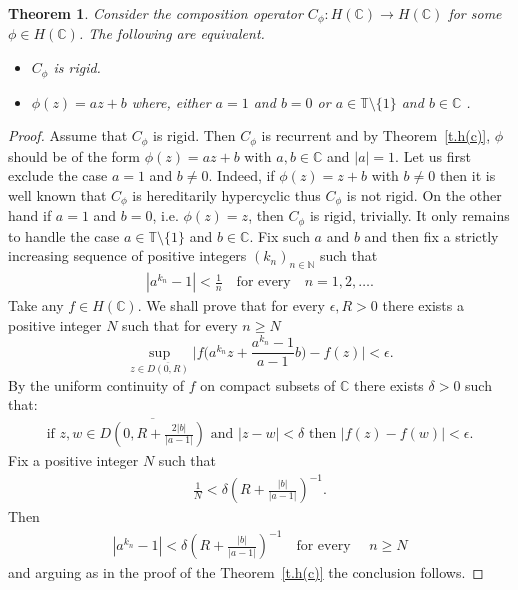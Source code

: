 \documentclass[12pt,leqno]{amsart}
\theoremstyle{plain}
\newtheorem{theorem}[equation]{Theorem}
\theoremstyle{definition}
\numberwithin{equation}{section}
\begin{document}
\begin{theorem}
	\label{t.h(rigid)} Consider the composition operator $C_\phi:H(\mathbb C)\to H(\mathbb C)$ for some $\phi \in H(\mathbb C)$. The following are equivalent. 
	\begin{itemize}
		\item[(i)] $C_{\phi}$ is rigid. 
		\item[(ii)] $\phi(z)=az+b$ where, either $a=1$ and $b=0$ or $a\in \mathbb T\setminus \{ 1\}$ and $b\in \mathbb C$ . 
	\end{itemize}
\end{theorem}

\begin{proof}
	Assume that $C_\phi$ is rigid. Then $C_\phi$ is recurrent and by Theorem~\ref{t.h(c)}, $\phi$ should be of the form $\phi(z)=az+b$ with $a,b\in\mathbb C$ and $|a|=1$. Let us first exclude the case $a=1$ and $b\neq 0$. Indeed, if $\phi (z)=z+b$ with $b\neq 0$ then it is well known that $C_{\phi}$ is hereditarily hypercyclic thus $C_{\phi}$ is not rigid. On the other hand if $a=1$ and $b=0$, i.e. $\phi (z)=z$, then $C_{\phi }$ is rigid, trivially. It only remains to handle the case $a\in \mathbb T\setminus \{ 1\}$ and $b\in \mathbb C$. Fix such $a$ and $b$ and then fix a strictly increasing sequence of positive integers $(k_n)_{n\in\mathbb N}$ such that 
	\begin{align*}
		|a^{k_n}-1|<\frac{1}{n} \quad \text{for every} \quad n=1,2,\ldots . 
	\end{align*}
	Take any $f\in H(\mathbb C)$. We shall prove that for every $\epsilon,R>0$ there exists a positive integer $N$ such that for every $n\geq N$ 
	\begin{equation*}
		\sup_{z\in \overline{D(0,R)}} {\biggl\lvert{f\big(a^{k_n}z+\frac{a^{k_n}-1}{a-1}b\big)-f(z)}\biggr\rvert}<\epsilon. 
	\end{equation*}
	By the uniform continuity of $f$ on compact subsets of $\mathbb C$ there exists $\delta>0$ such that:
	\begin{align*}
		\text{if } z,w\in \overline{D\left(0,R+\frac{2|b|}{|a-1|}\right)}\text{ and } |z-w|<\delta \text{ then }{\bigl\lvert{f(z)-f(w)}\bigr\rvert}<\epsilon. 
	\end{align*}
	Fix a positive integer $N$ such that 
	\begin{align*}
		\frac{1}{N}<{\delta}{(R+\frac{|b|}{|a-1|})^{-1}}. 
	\end{align*}
	Then 
	\begin{align*}
		|a^{k_n}-1|<{\delta}{(R+\frac{|b|}{|a-1|})^{-1}} \quad \text{for every } \quad n\geq N 
	\end{align*}
	and arguing as in the proof of the Theorem~\ref{t.h(c)} the conclusion follows. 
\end{proof}
\end{document}
